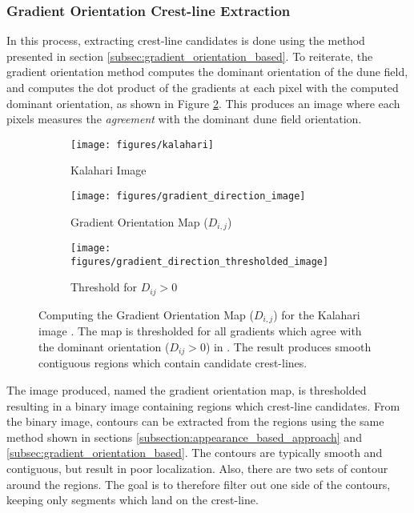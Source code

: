 \subsubsection{Gradient Orientation Crest-line Extraction}

In this process, extracting crest-line candidates is done using the method presented in section \ref{subsec:gradient_orientation_based}. To reiterate, the gradient orientation method computes the dominant orientation of the dune field, and computes the dot product of the gradients at each pixel with the computed dominant orientation, as shown in Figure \ref{fig:gradient_orientation_map_kalahari}. This produces an image where each pixels measures the \emph{agreement} with the dominant dune field orientation.  

\begin{figure}
	\centering
	\begin{subfigure}{0.48\textwidth}
		\centering
		\texttt{[image: figures/kalahari]}
		\caption{Kalahari Image}
		\label{fig:gradient_orientation_kalahari_input}
	\end{subfigure}
	\begin{subfigure}{0.48\textwidth}
		\centering
		\texttt{[image: figures/gradient\_direction\_image]}
		\caption{ Gradient Orientation Map ($D_{i,j}$) }
		\label{fig:gradient_orientation_map_kalahari}
	\end{subfigure}
	\begin{subfigure}{0.8\textwidth}
		\centering
		\texttt{[image: figures/gradient\_direction\_thresholded\_image]}
		\caption{ Threshold for $D_{ij} > 0$ }
		\label{fig:threshold_gradient_orientation_map_kalahari}
	\end{subfigure}
	\caption{ Computing the Gradient Orientation Map  ($D_{i,j}$) for the Kalahari image . The map is thresholded for all gradients which agree with the dominant orientation ($D_{ij} > 0$) in . The result produces smooth contiguous regions which contain candidate crest-lines. }
	\label{fig:gradient_orientation_map}
\end{figure}

The image produced, named the gradient orientation map, is thresholded resulting in a binary image containing regions which crest-line candidates. From the binary image, contours can be extracted from the regions using the same method shown in sections \ref{subsection:appearance_based_approach} and \ref{subsec:gradient_orientation_based}. The contours are typically smooth and contiguous, but result in poor localization. Also, there are two sets of contour around the regions. The goal is to therefore filter out one side of the contours, keeping only segments which land on the crest-line.


